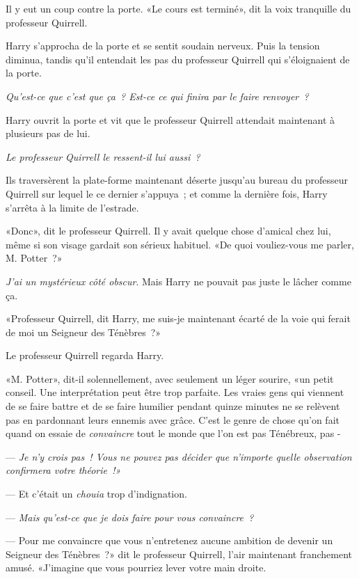 Il y eut un coup contre la porte. «Le cours est terminé», dit la voix tranquille du professeur Quirrell.

Harry s'approcha de la porte et se sentit soudain nerveux. Puis la tension diminua, tandis qu'il entendait les pas du professeur Quirrell qui s'éloignaient de la porte.

\emph{Qu'est-ce que c'est que ça~? Est-ce ce qui finira par le faire renvoyer~?}

Harry ouvrit la porte et vit que le professeur Quirrell attendait maintenant à plusieurs pas de lui.

\emph{Le professeur Quirrell le ressent-il lui aussi~?}

Ils traversèrent la plate-forme maintenant déserte jusqu'au bureau du professeur Quirrell sur lequel le ce dernier s'appuya~; et comme la dernière fois, Harry s'arrêta à la limite de l'estrade.

«Donc», dit le professeur Quirrell. Il y avait quelque chose d'amical chez lui, même si son visage gardait son sérieux habituel. «De quoi vouliez-vous me parler, M. Potter~?»

\emph{J'ai un mystérieux côté obscur}. Mais Harry ne pouvait pas juste le lâcher comme ça.

«Professeur Quirrell, dit Harry, me suis-je maintenant écarté de la voie qui ferait de moi un Seigneur des Ténèbres~?»

Le professeur Quirrell regarda Harry.

«M. Potter», dit-il solennellement, avec seulement un léger sourire, «un petit conseil. Une interprétation peut être trop parfaite. Les vraies gens qui viennent de se faire battre et de se faire humilier pendant quinze minutes ne se relèvent pas en pardonnant leurs ennemis avec grâce. C'est le genre de chose qu'on fait quand on essaie de \emph{convaincre} tout le monde que l'on est pas Ténébreux, pas -

--- \emph{Je n'y crois pas~! Vous ne pouvez pas décider que n'importe quelle observation confirmera votre théorie~!»}

--- Et c'était un \emph{chouia} trop d'indignation.

--- \emph{Mais qu'est-ce que je dois faire pour vous convaincre~?}

--- Pour me convaincre que vous n'entretenez aucune ambition de devenir un Seigneur des Ténèbres~?» dit le professeur Quirrell, l'air maintenant franchement amusé. «J'imagine que vous pourriez lever votre main droite.

